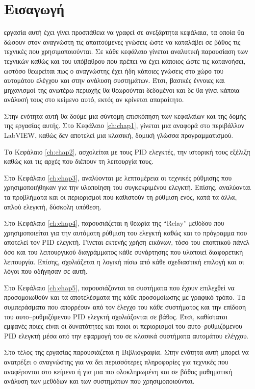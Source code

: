 
\chapter*{Εισαγωγή}
\lettrine[findent=2pt]{}{} εργασία αυτή έχει γίνει προσπάθεια να γραφεί σε ανεξάρτητα κεφάλαια, τα οποία θα δώσουν στον αναγνώστη τις απαιτούμενες γνώσεις ώστε να καταλάβει σε βάθος τις τεχνικές που χρησιμοποιούνται. Σε κάθε κεφάλαιο γίνεται αναλυτική παρουσίαση των τεχνικών καθώς και του υπόβαθρου που πρέπει να έχει κάποιος ώστε τις κατανοήσει, ωστόσο θεωρείται πως ο αναγνώστης έχει ήδη κάποιες γνώσεις στο χώρο του αυτομάτου ελέγχου και στην ανάλυση συστημάτων. Έτσι, βασικές έννοιες και μηχανισμοί της ανωτέρω περιοχής θα θεωρούνται δεδομένοι και δε θα γίνει κάποια ανάλυσή τους στο κείμενο αυτό, εκτός αν κρίνεται απαραίτητο.

Στην ενότητα αυτή θα δούμε μια σύντομη επισκόπηση των κεφαλαίων και της δομής της εργασίας αυτής. Στο Κεφάλαιο \ref{ch:chap1}, γίνεται μια αναφορά στο περιβάλλον LabVIEW, καθώς δεν αποτελεί μια κλασική, δομική γλώσσα προγραμματισμού.

Το Κεφάλαιο \ref{ch:chap2}, ασχολείται με τους PID ελεγκτές, την ιστορική τους εξέλιξη καθώς και τις αρχές που διέπουν τη λειτουργία τους.

Στο Κεφάλαιο \ref{ch:chap3}, αναλύονται με λεπτομέρεια οι τεχνικές ρύθμισης που χρησιμοποιήθηκαν για την υλοποίηση του συγκεκριμένου ελεγκτή. Επίσης, αναλύονται τα προβλήματα και οι περιορισμοί που καθιστούν τη ρύθμιση ενός, κατά τα άλλα, απλού ελεγκτή, δύσκολη υπόθεση. 

Στο Κεφάλαιο \ref{ch:chap4}, παρουσιάζεται η θεωρία της ``Relay" μεθόδου που χρησιμοποιείται για την αυτόματη ρύθμιση του ελεγκτή καθώς και το πρόγραμμα που αποτελεί τον PID ελεγκτή. Γίνεται εκτενής χρήση εικόνων, τόσο του εποπτικού πάνελ όσο και του λειτουργικού διαγράμματος κάθε συνάρτησης που υλοποιεί διαφορετική λειτουργία. Επίσης, σχολιάζεται η λογική πίσω από κάθε σχεδιαστική επιλογή και οι λόγοι που οδήγησαν σε αυτή.

Στο Κεφάλαιο \ref{ch:chap5}, παρουσιάζονται τα συστήματα που έχουν επιλεχθεί να προσομοιωθούν και τα αποτελέσματα της κάθε προσομοίωσης με γραφικό τρόπο. Τα συμπεράσματα που απορρέουν από τον έλεγχο του κάθε συστήματος και την επίδοση του αυτο--ρυθμιζόμενου PID ελεγκτή σχολιάζονται σε βάθος. Έτσι, καθίσταται εμφανές ποιες είναι οι δυνατότητες και ποιοι οι περιορισμοί του αυτο--ρυθμιζόμενου PID ελεγκτή μέσα από την εφαρμογή του σε κλασικά συστήματα αυτομάτου ελέγχου.

Στο τέλος της εργασίας παρουσιάζεται η Βιβλιογραφία. Στην ενότητα αυτή μπορεί να ανατρέξει ο αναγνώστης για να δει περισσότερες πληροφορίες για τεχνικές που αναφέρονται στο κείμενο ή για μια πιο ολοκληρωμένη και σε βάθος μαθηματική ανάλυση των μεθόδων και των συστημάτων που χρησιμοποιούνται.